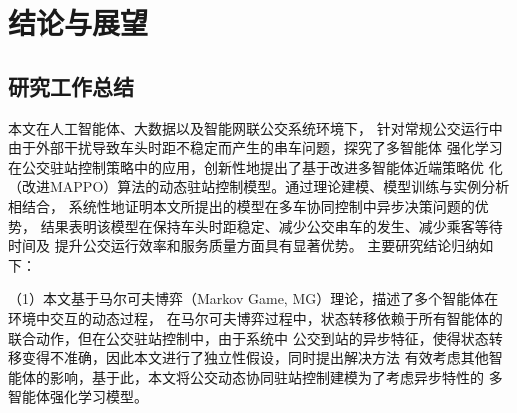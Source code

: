 



\chapter{结论与展望}
\section{研究工作总结}
本文在人工智能体、大数据以及智能网联公交系统环境下，
针对常规公交运行中由于外部干扰导致车头时距不稳定而产生的串车问题，探究了多智能体
强化学习在公交驻站控制策略中的应用，创新性地提出了基于改进多智能体近端策略优
化（改进MAPPO）算法的动态驻站控制模型。通过理论建模、模型训练与实例分析相结合，
系统性地证明本文所提出的模型在多车协同控制中异步决策问题的优势，
结果表明该模型在保持车头时距稳定、减少公交串车的发生、减少乘客等待时间及
提升公交运行效率和服务质量方面具有显著优势。
主要研究结论归纳如下：

（1）本文基于马尔可夫博弈（Markov Game, MG）理论，描述了多个智能体在环境中交互的动态过程，
在马尔可夫博弈过程中，状态转移依赖于所有智能体的联合动作，但在公交驻站控制中，由于系统中
公交到站的异步特征，使得状态转移变得不准确，因此本文进行了独立性假设，同时提出解决方法
有效考虑其他智能体的影响，基于此，本文将公交动态协同驻站控制建模为了考虑异步特性的
多智能体强化学习模型。

